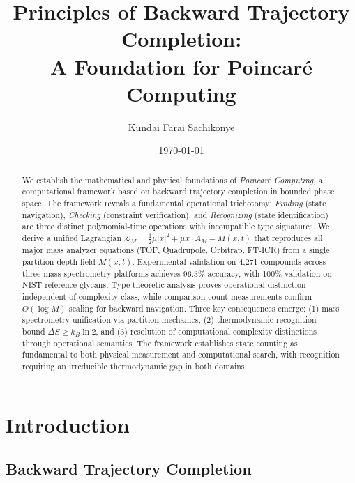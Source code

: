 \documentclass[twocolumn,aps,prl,superscriptaddress,floatfix]{revtex4-2}
\begin{document}
\title{Principles of Backward Trajectory Completion:\\
A Foundation for Poincar\'e Computing}

\author{Kundai Farai Sachikonye}

\date{\today}

\begin{abstract}
We establish the mathematical and physical foundations of \emph{Poincar\'e Computing}, a computational framework based on backward trajectory completion in bounded phase space. The framework reveals a fundamental operational trichotomy: \emph{Finding} (state navigation), \emph{Checking} (constraint verification), and \emph{Recognizing} (state identification) are three distinct polynomial-time operations with incompatible type signatures. We derive a unified Lagrangian $\mathcal{L}_M = \frac{1}{2}\mu|\dot{x}|^2 + \mu\dot{x}\cdot A_M - M(x,t)$ that reproduces all major mass analyzer equations (TOF, Quadrupole, Orbitrap, FT-ICR) from a single partition depth field $M(x,t)$. Experimental validation on 4,271 compounds across three mass spectrometry platforms achieves 96.3\% accuracy, with 100\% validation on NIST reference glycans. Type-theoretic analysis proves operational distinction independent of complexity class, while comparison count measurements confirm $O(\log M)$ scaling for backward navigation. Three key consequences emerge: (1) mass spectrometry unification via partition mechanics, (2) thermodynamic recognition bound $\Delta S \geq k_B \ln 2$, and (3) resolution of computational complexity distinctions through operational semantics. The framework establishes state counting as fundamental to both physical measurement and computational search, with recognition requiring an irreducible thermodynamic gap in both domains.
\end{abstract}

\maketitle

\section{Introduction}

\subsection{Backward Trajectory Completion}
\end{document}
